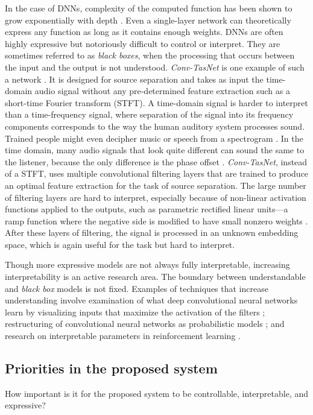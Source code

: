 In the case of DNNs, complexity of the computed function has been shown to grow exponentially with depth \cite{raghu2017expressive}. Even a single-layer network can theoretically express any function as long as it contains enough weights. DNNs are often highly expressive but notoriously difficult to control or interpret. They are sometimes referred to as \textit{black boxes}, when the processing that occurs between the input and the output is not understood. \textit{Conv-TasNet} is one example of such a network \cite{luo2019conv}. It is designed for source separation and takes as input the time-domain audio signal without any pre-determined feature extraction such as a short-time Fourier transform (STFT). A time-domain signal is harder to interpret than a time-frequency signal, where separation of the signal into its frequency  components corresponds to the way the human auditory system processes sound. Trained people might even decipher music or speech from a spectrogram \cite[][Ch.~3, p.~41]{raphael-i547}. In the time domain, many audio signals that look quite different can sound the same to the listener, because the only difference is the phase offset \cite{engel2020ddsp}. \textit{Conv-TasNet}, instead of a STFT, uses multiple convolutional filtering layers that are trained to produce an optimal feature extraction for the task of source separation. The large number of filtering layers are hard to interpret, especially because of non-linear activation functions applied to the outputs, such as parametric rectified linear units---a ramp function where the negative side is modified to have small nonzero weights \cite{he2015delving}. After these layers of filtering, the signal is processed in an unknown embedding space, which is again useful for the task but hard to interpret.

Though more expressive models are not always fully interpretable, increasing interpretability is an active research area. The boundary between understandable and \textit{black box} models is not fixed. Examples of techniques that increase understanding involve examination of what deep convolutional neural networks learn by visualizing inputs that maximize the activation of the filters \cite{qin2018convolutional}; restructuring of convolutional neural networks as probabilistic models \cite{patel2016probabilistic}; and research on interpretable parameters in reinforcement learning \cite{verma2018programmatically}. 

\subsection{Priorities in the proposed system}
How important is it for the proposed system to be controllable, interpretable, and expressive?

